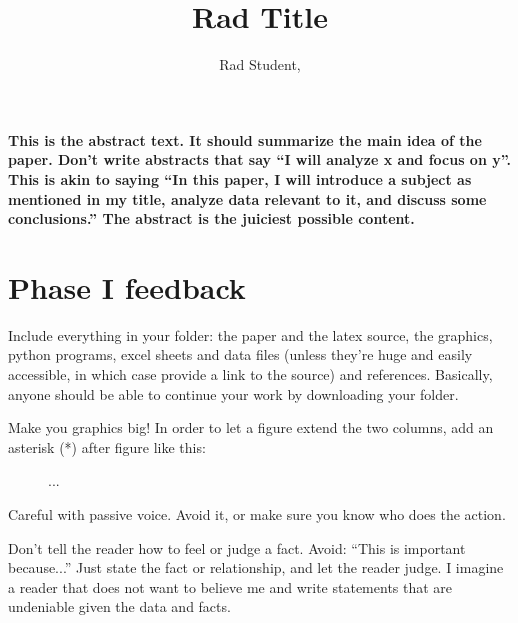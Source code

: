 \documentclass[11pt, twocolumn]{article}
\title{Rad Title} %
\author{Rad Student, } %
\date{} %
\begin{document}
\maketitle %

\thispagestyle{fancy} %


\noindent \textbf{This is the abstract text. It should summarize the main idea of the paper. Don't write abstracts that say ``I will analyze x and focus on y''. This is akin to saying ``In this paper, I will introduce a subject as mentioned in my title, analyze data relevant to it, and discuss some conclusions.'' The abstract is the juiciest possible content.}


\section*{Phase I feedback}
Include everything in your folder: the paper and the latex source, the graphics, python programs, excel sheets and data files (unless they're huge and easily accessible, in which case provide a link to the source) and references. Basically, anyone should be able to continue your work by downloading your folder.

Make you graphics big! In order to let a figure extend the two columns, add an asterisk (*) after figure like this:
\begin{verbatim*}
\begin{figure}
...
\end{figure}
\end{verbatim*}



Careful with passive voice. Avoid it, or make sure you know who does the action.

Don't tell the reader how to feel or judge a fact. Avoid: ``This is important because...'' Just state the fact or relationship, and let the reader judge. I imagine a reader that does not want to believe me and write statements that are undeniable given the data and facts.
\end{document}

